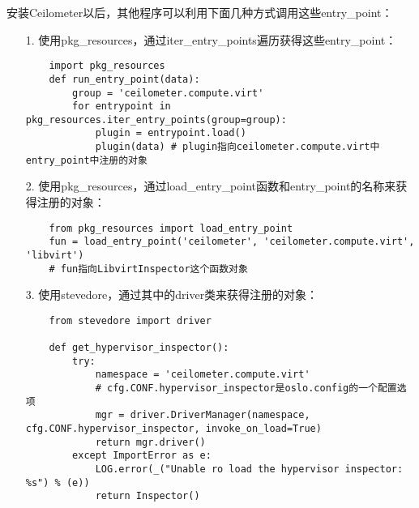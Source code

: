 \documentclass[a4paper,left=1.5cm,right=1.5cm,11pt]{article}
\begin{document}
	安装Ceilometer以后，其他程序可以利用下面几种方式调用这些entry\_point：
	\begin{itemize}
		\item[1.] 使用pkg\_resources，通过iter\_entry\_points遍历获得这些entry\_point：
		\begin{lstlisting}
	import pkg_resources
	def run_entry_point(data):
		group = 'ceilometer.compute.virt'
		for entrypoint in pkg_resources.iter_entry_points(group=group):
			plugin = entrypoint.load()
			plugin(data) # plugin指向ceilometer.compute.virt中entry_point中注册的对象
		\end{lstlisting}

		\item[2.] 使用pkg\_resources，通过load\_entry\_point函数和entry\_point的名称来获得注册的对象：
		\begin{lstlisting}
	from pkg_resources import load_entry_point
	fun = load_entry_point('ceilometer', 'ceilometer.compute.virt', 'libvirt')
	# fun指向LibvirtInspector这个函数对象
		\end{lstlisting}

		\item[3.] 使用stevedore，通过其中的driver类来获得注册的对象：
		\begin{lstlisting}
	from stevedore import driver

	def get_hypervisor_inspector():
		try:
			namespace = 'ceilometer.compute.virt'
			# cfg.CONF.hypervisor_inspector是oslo.config的一个配置选项
			mgr = driver.DriverManager(namespace, cfg.CONF.hypervisor_inspector, invoke_on_load=True)
			return mgr.driver()
		except ImportError as e:
			LOG.error(_("Unable ro load the hypervisor inspector: %s") % (e))
			return Inspector()
		\end{lstlisting}
	\end{itemize}
\end{document}

